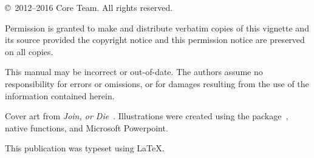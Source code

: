 \null
\vfill

\copyright\ 2012--2016 \pbdR Core Team.  All rights reserved.

Permission is granted to make and distribute verbatim copies of this vignette
and its source provided the copyright notice and this permission notice are
preserved on all copies.

This manual may be incorrect or out-of-date.  The authors assume
no responsibility for errors or omissions, or for damages resulting
from the use of the information contained herein.

Cover art from \textit{Join, or Die}~\citep{franklin1754join}. Illustrations were created 
using the  package~\citep{ggplot2}, native  functions, and Microsoft 
Powerpoint.

This publication was typeset using \LaTeX. 

